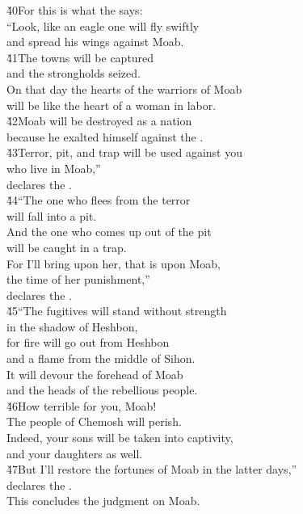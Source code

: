 \begin{poetry}
\poeml \v{40}For this is what the  says: \\
\poeml ``Look, like an eagle one will fly swiftly \\
\poemll    and spread his wings against Moab. \\
\poeml \v{41}The towns will be captured \\
\poemll    and the strongholds seized. \\
\poeml On that day the hearts of the warriors of Moab \\
\poemll    will be like the heart of a woman in labor. \\
\poeml \v{42}Moab will be destroyed as a nation \\
\poemll    because he exalted himself against the . \\
\poeml \v{43}Terror, pit, and trap will be used against you \\
\poemll    who live in Moab,'' \\
\poemlll       declares the . \\
\poeml \v{44}``The one who flees from the terror \\
\poemll    will fall into a pit. \\
\poeml And the one who comes up out of the pit \\
\poemll    will be caught in a trap. \\
\poeml For I'll bring upon her, that is upon Moab, \\
\poemll    the time of her punishment,'' \\
\poemlll       declares the . \\
\poeml \v{45}``The fugitives will stand without strength \\
\poemll    in the shadow of Heshbon, \\
\poeml for fire will go out from Heshbon \\
\poemll    and a flame from the middle of Sihon. \\
\poeml It will devour the forehead of Moab \\
\poemll    and the heads of the rebellious people. \\
\poeml \v{46}How terrible for you, Moab! \\
\poemll    The people of Chemosh will perish. \\
\poeml Indeed, your sons will be taken into captivity, \\
\poemll    and your daughters as well. \\
\poeml \v{47}But I'll restore the fortunes of Moab in the latter days,'' \\
\poemll    declares the . \\
\poeml This concludes the judgment on Moab.
\end{poetry}
